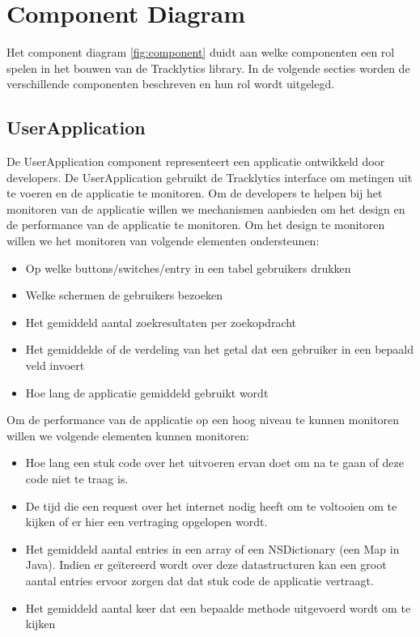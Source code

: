 \section{Component Diagram}
Het component diagram \ref{fig:component} duidt aan welke componenten een rol spelen in het bouwen van de Tracklytics library. In de volgende secties worden de verschillende componenten beschreven en hun rol wordt uitgelegd.


\subsection{UserApplication}
De UserApplication component representeert een applicatie ontwikkeld door developers. De UserApplication gebruikt de Tracklytics interface om metingen uit te voeren en de applicatie te monitoren. Om de developers te helpen bij het monitoren van de applicatie willen we mechanismen aanbieden om het design en de performance van de applicatie te monitoren. Om het design te monitoren willen we het monitoren van volgende elementen ondersteunen:
\begin{itemize}
\item Op welke buttons/switches/entry in een tabel gebruikers drukken
\item Welke schermen de gebruikers bezoeken
\item Het gemiddeld aantal zoekresultaten per zoekopdracht
\item Het gemiddelde of de verdeling van het getal dat een gebruiker in een bepaald veld invoert
\item Hoe lang de applicatie gemiddeld gebruikt wordt
\end{itemize}

Om de performance van de applicatie op een hoog niveau te kunnen monitoren willen we volgende elementen kunnen monitoren:
\begin{itemize}
\item Hoe lang een stuk code over het uitvoeren ervan doet om na te gaan of deze code niet te traag is.
\item De tijd die een request over het internet nodig heeft om te voltooien om te kijken of er hier een vertraging opgelopen wordt.
\item Het gemiddeld aantal entries in een array of een NSDictionary (een Map in Java). Indien er ge\"itereerd wordt over deze datastructuren kan een groot aantal entries ervoor zorgen dat dat stuk code de applicatie vertraagt.
\item Het gemiddeld aantal keer dat een bepaalde methode uitgevoerd wordt om te kijken

\end{itemize}


